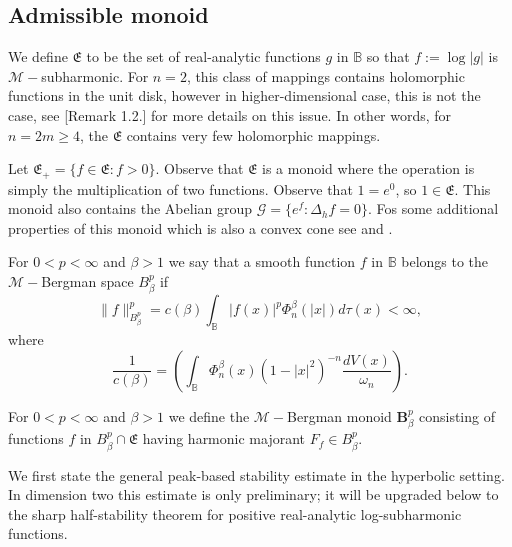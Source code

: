 \documentclass[a4paper,10pt]{amsart}
\begin{document}




\subsection{Admissible monoid}\label{ssec:admissible}
We define $\mathfrak{E}$ to be the set of real-analytic  functions $g$ in $\mathbb{B}$  so that
$f:=\log |g|$ is $\mathcal{M}-$subharmonic. For $n=2$, this class of mappings contains holomorphic functions in the unit disk, however in higher-dimensional case, this is not the case, see \cite{kalaj2024}[Remark 1.2.] for more details on this issue. In other words, for $n=2m\ge 4$, the $\mathfrak{E}$ contains very few holomorphic mappings.

Let  $\mathfrak{E}_+=\{f\in \mathfrak{E}: f>0\}$. Observe that $\mathfrak{E}$ is a monoid where the operation is simply the multiplication of two functions.  Observe that $1=e^0$, so $1\in \mathfrak{E}$. This monoid also contains the Abelian group $\mathcal{G}=\{e^f: \Delta_hf=0\}$. Fos some additional properties of this monoid which is also a convex cone see \cite{kalaj2024} and \cite{kalajramos2024}.



\begin{numdefn}
For $0 < p < \infty$ and $\beta > 1$ we say that a smooth function $f$  in $\mathbb{B}$ belongs to the $\mathcal{M}-$Bergman space ${B}^p_\beta$ if
$$\|f\|_{{B}^p_\beta}^p = c(\beta)\int_\mathbb{B} |f(x)|^p \Phi_n^\beta(|x|) d\tau(x) < \infty,$$ where
$$\frac{1}{c(\beta)}=\left( \int_{\mathbb{B}} \Phi^\beta_n(x)(1-|x|^2)^{-n}\frac{dV(x)}{{\omega_n}}\right).$$
\end{numdefn}
\begin{numdefn}
 For $0 < p < \infty$ and $\beta > 1$ we define
the $\mathcal{M}-$Bergman monoid $\mathbf{B}^p_\beta$ consisting of functions $f$ in ${B}^p_\beta\cap \mathfrak{E}$ having harmonic majorant $F_f\in {B}^p_\beta$.
\end{numdefn}


We first state the general peak-based stability estimate in the hyperbolic
setting. In dimension two this estimate is only preliminary; it will be
upgraded below to the sharp half-stability theorem for positive real-analytic
log-subharmonic functions.
\end{document}
